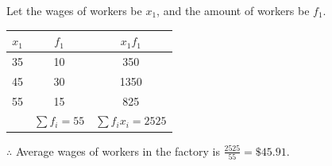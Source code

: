 \documentclass{report}
\begin{document}
\begin{multicols}{2}
\begin{enumerate}
          Let the wages of workers be $x_1$, and the amount of workers be $f_1$.
          \begin{center}
            \begin{tabular}{|c|c|c|}
              \hline
              $x_1$ & $f_1$           & $x_1f_1$              \\
              \hline
              35    & 10              & 350                   \\
              45    & 30              & 1350                  \\
              55    & 15              & 825                   \\
              \hline
                    & $\sum f_i = 55$ & $\sum f_i x_i = 2525$ \\
              \hline
            \end{tabular}
          \end{center}
          $\therefore $ Average wages of workers in the factory is $\frac{2525}{55} = \$45.91$.


\end{enumerate}
\end{multicols}
\end{document}
